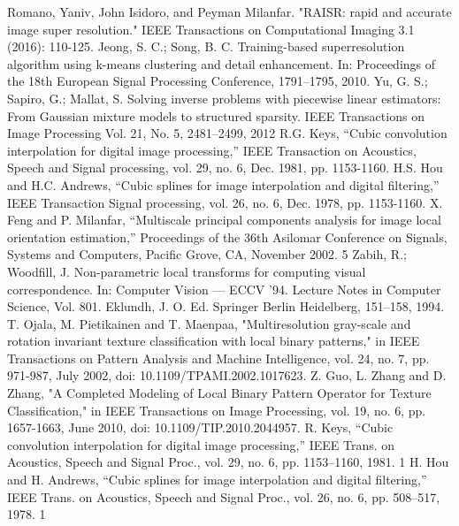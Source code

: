 \documentclass[12pt, a4paper, oneside]{ctexbook}
\begin{document}
	\newpage
	\begin{thebibliography}{99}
		Romano, Yaniv, John Isidoro, and Peyman Milanfar. "RAISR: rapid and accurate image super resolution." IEEE Transactions on Computational Imaging 3.1 (2016): 110-125.
		Jeong, S. C.; Song, B. C. Training-based superresolution algorithm using k-means clustering and detail enhancement. In: Proceedings of the 18th European Signal Processing Conference, 1791–1795, 2010.
		 Yu, G. S.; Sapiro, G.; Mallat, S. Solving inverse problems with piecewise linear estimators: From Gaussian mixture models to structured sparsity. IEEE Transactions on Image Processing Vol. 21, No. 5, 2481–2499, 2012
		R.G. Keys, “Cubic convolution interpolation for digital image processing,” IEEE Transaction on Acoustics, Speech and Signal processing, vol. 29, no. 6, Dec. 1981, pp. 1153-1160.
		H.S. Hou and H.C. Andrews, “Cubic splines for image interpolation and digital filtering,” IEEE Transaction Signal processing, vol. 26, no. 6, Dec. 1978, pp. 1153-1160.
		X. Feng and P. Milanfar, “Multiscale principal components analysis for image local orientation estimation,” Proceedings of the 36th Asilomar Conference on Signals, Systems and Computers, Pacific Grove, CA, November 2002. 5
		Zabih, R.; Woodfill, J. Non-parametric local transforms for computing visual correspondence. In: Computer Vision — ECCV ’94. Lecture Notes in Computer Science, Vol. 801. Eklundh, J. O. Ed. Springer Berlin Heidelberg, 151–158, 1994.
		T. Ojala, M. Pietikainen and T. Maenpaa, "Multiresolution gray-scale and rotation invariant texture classification with local binary patterns," in IEEE Transactions on Pattern Analysis and Machine Intelligence, vol. 24, no. 7, pp. 971-987, July 2002, doi: 10.1109/TPAMI.2002.1017623.
		Z. Guo, L. Zhang and D. Zhang, "A Completed Modeling of Local Binary Pattern Operator for Texture Classification," in IEEE Transactions on Image Processing, vol. 19, no. 6, pp. 1657-1663, June 2010, doi: 10.1109/TIP.2010.2044957.
		 R. Keys, “Cubic convolution interpolation for digital image processing,” IEEE Trans. on Acoustics, Speech and Signal Proc., vol. 29, no. 6, pp. 1153–1160, 1981. 1
		H. Hou and H. Andrews, “Cubic splines for image interpolation and digital filtering,” IEEE Trans. on Acoustics, Speech and Signal Proc., vol. 26, no. 6, pp. 508–517, 1978. 1		
	\end{thebibliography}
	
	
\end{document}
